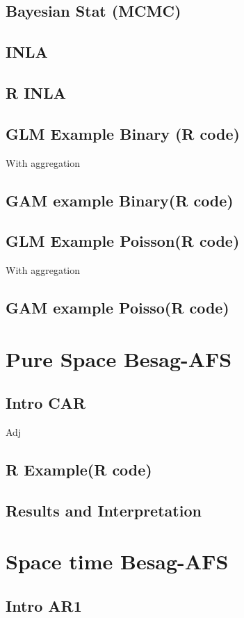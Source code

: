 \documentclass[12pt,a4paper]{article}
\begin{document}
\subsection{Bayesian Stat (MCMC)}
\subsection{INLA}
\subsection{R INLA}
\subsection{GLM Example Binary (R code)}
With aggregation
\subsection{GAM example  Binary(R code)}
\subsection{GLM Example Poisson(R code)}
With aggregation
\subsection{GAM example  Poisso(R code)}



\section{Pure Space Besag-AFS}
\subsection{Intro CAR}
Adj
\subsection{R Example(R code)}
\subsection{Results and Interpretation}

\section{Space time Besag-AFS}
\subsection{Intro AR1}
\end{document}
